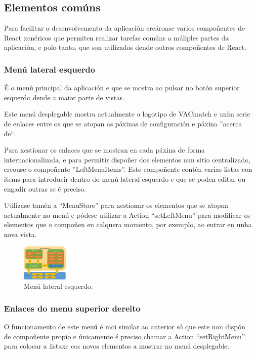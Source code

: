     \subsection{Elementos comúns}
    Para facilitar o desenvolvemento da aplicación creáronse varios 
compoñentes de React xenéricos que permiten realizar tarefas comúns a múliples 
partes da aplicación, e polo tanto, que son utilizados dende outros compoñentes 
de React.

      \subsubsection{Menú lateral esquerdo}
      É o menú principal da aplicación e que se mostra ao pulsar no botón 
superior esquerdo dende a maior parte de vistas.

      Este menú desplegable mostra actualmente o logotipo de VACmatch e unha 
serie de enlaces entre os que se atopan as páxinas de configuración e páxina 
''acerca de``.

      Para xestionar os enlaces que se mostran en cada páxina de forma 
internacionalizada, e para permitir dispoñer dos elementos nun sitio 
centralizado, creouse o compoñente ''LeftMenuItems''.
      Este compoñente contén varias listas con items para introducir dentro do 
menú lateral esquerdo e que se poden editar ou engadir outras se é 
preciso.

      Utilizase tamén a ``MenuStore'' para xestionar os elementos que se atopan 
actualmente no menú e pódese utilizar a Action ``setLeftMenu'' para 
modificar os elementos que o compoñen en calquera momento, por exemplo, ao 
entrar en unha nova vista.

      \begin{figure}[h!]
        \begin{center}
        \includegraphics[width=0.2\textwidth]{./img/cordova_arquitectura.png}
        \caption{Menú lateral esquerdo.}
        \end{center}
      \end{figure}

      \subsubsection{Enlaces do menu superior dereito}
      O funcionamento de este menú é moi similar ao anterior só que este 
non dispón de compoñente propio e únicamente é preciso chamar a Action 
``setRightMenu'' para colocar a listaxe cos novos elementos a mostrar no menú 
desplegable.

